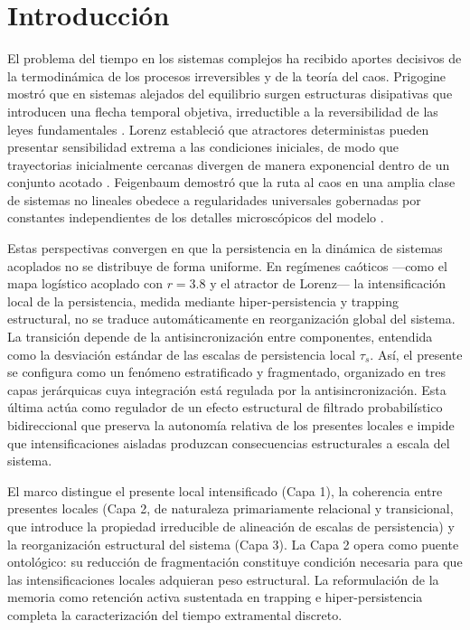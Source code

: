 \section{Introducción}

El problema del tiempo en los sistemas complejos ha recibido aportes decisivos de la termodinámica de los procesos irreversibles y de la teoría del caos. Prigogine mostró que en sistemas alejados del equilibrio surgen estructuras disipativas que introducen una flecha temporal objetiva, irreductible a la reversibilidad de las leyes fundamentales \citep{prigogine_being_to_becoming_1980,prigogine_stengers_order_out_chaos}. Lorenz estableció que atractores deterministas pueden presentar sensibilidad extrema a las condiciones iniciales, de modo que trayectorias inicialmente cercanas divergen de manera exponencial dentro de un conjunto acotado \citep{lorenz_deterministic_nonperiodic_1963}. Feigenbaum demostró que la ruta al caos en una amplia clase de sistemas no lineales obedece a regularidades universales gobernadas por constantes independientes de los detalles microscópicos del modelo \citep{feigenbaum_quantitative_universality_1978}.

Estas perspectivas convergen en que la persistencia en la dinámica de sistemas acoplados no se distribuye de forma uniforme. En regímenes caóticos —como el mapa logístico acoplado con $r=3.8$ y el atractor de Lorenz— la intensificación local de la persistencia, medida mediante hiper-persistencia y trapping estructural, no se traduce automáticamente en reorganización global del sistema. La transición depende de la antisincronización entre componentes, entendida como la desviación estándar de las escalas de persistencia local $\tau_s$. Así, el presente se configura como un fenómeno estratificado y fragmentado, organizado en tres capas jerárquicas cuya integración está regulada por la antisincronización. Esta última actúa como regulador de un efecto estructural de filtrado probabilístico bidireccional que preserva la autonomía relativa de los presentes locales e impide que intensificaciones aisladas produzcan consecuencias estructurales a escala del sistema.

El marco distingue el presente local intensificado (Capa 1), la coherencia entre presentes locales (Capa 2, de naturaleza primariamente relacional y transicional, que introduce la propiedad irreducible de alineación de escalas de persistencia) y la reorganización estructural del sistema (Capa 3). La Capa 2 opera como puente ontológico: su reducción de fragmentación constituye condición necesaria para que las intensificaciones locales adquieran peso estructural. La reformulación de la memoria como retención activa sustentada en trapping e hiper-persistencia completa la caracterización del tiempo extramental discreto.

